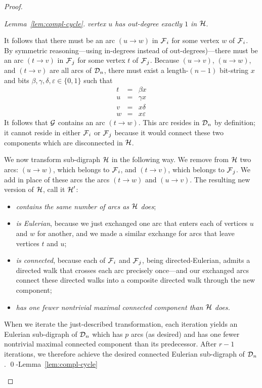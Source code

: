 \begin{proof}
\begin{proof}[Lemma~\ref{lem:compl-cycle}]
\smallskip

{\em vertex $u$ has out-degree {\em exactly} $1$ in $\mbox{$\cal H$}$}.

\smallskip

\noindent It follows that there must be an arc $(u \rightarrow w)$ in $\mbox{$\cal F$}_i$ for some vertex $w$ of $\mbox{$\cal F$}_i$.  By symmetric reasoning---using in-degrees instead of out-degrees)---there must be an arc  $(t \rightarrow v)$ in $\mbox{$\cal F$}_j$ for some vertex $t$ of $\mbox{$\cal F$}_j$.  Because $(u \rightarrow v)$, $(u \rightarrow w)$, and $(t \rightarrow v)$ are all arcs of $\mbox{$\cal D$}_n$, there must exist a length-$(n-1)$ bit-string $x$ and bits $\beta, \gamma, \delta, \varepsilon \in \{0,1\}$ such that
\begin{eqnarray*}
t & = & \beta x    \\
u & = & \gamma x   \\
v & = & x \delta   \\
w & = & x \varepsilon
\end{eqnarray*}
It follows that $\mbox{$\cal G$}$ contains an arc $(t \rightarrow w)$.  This arc resides in $\mbox{$\cal D$}_n$ by definition; it cannot reside in either $\mbox{$\cal F$}_i$ or $\mbox{$\cal F$}_j$ because it would connect these two components which are disconnected in $\mbox{$\cal H$}$.

\medskip

We now transform sub-digraph $\mbox{$\cal H$}$ in the following way. We remove from $\mbox{$\cal H$}$ two arcs: 
$(u \rightarrow w)$, which belongs to $\mbox{$\cal F$}_i$, and $(t \rightarrow v)$, which belongs to $\mbox{$\cal F$}_j$.  We
add in place of these arcs the arcs $(t \rightarrow w)$ and $(u \rightarrow v)$.  The resulting
new version of $\mbox{$\cal H$}$, call it $\mbox{$\cal H$}'$:
\begin{itemize}
\item
{\em contains the same number of arcs as $\mbox{$\cal H$}$ does};
\medskip\item
{\em is Eulerian}, because we just exchanged one arc that enters each of vertices $u$ and $w$
for another, and we made a similar exchange for arcs that leave vertices $t$ and $u$;
\medskip\item
{\em is connected}, because each of $\mbox{$\cal F$}_i$ and $\mbox{$\cal F$}_j$, being directed-Eulerian, admits a directed walk that crosses each arc precisely once---and our exchanged arcs connect these directed walks into a composite directed walk through the new component;
\medskip\item
{\em has one fewer nontrivial maximal connected component than $\mbox{$\cal H$}$ does.}
\end{itemize}

When we iterate the just-described transformation, each iteration yields an Eulerian sub-digraph of $\mbox{$\cal D$}_n$ which has $p$ arcs (as desired) and has one fewer nontrivial maximal connected component than its predecessor.  After $r-1$ iterations, we therefore achieve the desired connected Eulerian sub-digraph of $\mbox{$\cal D$}_n$.  \qed-Lemma~\ref{lem:compl-cycle}
\end{proof}


\end{proof}
